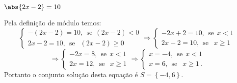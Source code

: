 \begin{exem}
 $\abs{2x-2}= 10$

  Pela definição de módulo temos:
  \[
  \begin{cases}
      -(2x-2)= 10, \ \ \text{se} \ \ (2x-2)<0 \\
      2x-2= 10, \ \ \text{se } \ \ (2x-2) \geq 0
     \end{cases}
     \Rightarrow
     \begin{cases}
      -2x + 2= 10, \ \ \text{se} \ \ x< 1 \\
      2x - 2= 10, \ \ \text{se } \ \ x \geq 1
     \end{cases}
     \]
     \[
     \Rightarrow
     \begin{cases}
      -2x= 8, \ \ \text{se} \ \ x< 1 \\
       2x= 12, \ \ \text{se } \ \ x \geq 1
     \end{cases}
     \Rightarrow
     \begin{cases}
      x= -4, \ \ \text{se} \ \ x< 1 \\
      x= 6, \ \ \text{se } \ \ x \geq 1 \ .
     \end{cases}
  \]
  Portanto o conjunto solução desta equação é $S= \left\{-4, 6 \right\}$.
 \end{exem}
 
